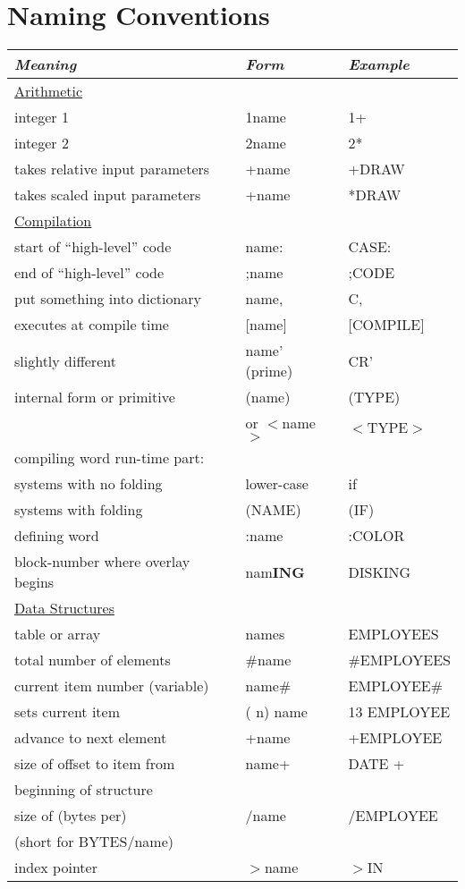 \section{Naming Conventions}
\begin{longtable}{lll}
{}{\setlength{\parsep}{0cm}}
{\em Meaning}&{\em Form}&{\em Example}\\[2ex] \endhead
\underline{Arithmetic}\\
integer 1&1name&1+\\
integer 2&2name&2*\\
takes relative input parameters&+name&+DRAW\\
takes scaled input parameters&+name&*DRAW\\[1ex]
\underline{Compilation}\\
start of ``high-level'' code&name:&CASE:\\
end of ``high-level'' code&;name&;CODE\\
put something into dictionary&name,&C,\\
executes at compile time&[name]&[COMPILE]\\
slightly different&name' (prime)&CR'\\
internal form or primitive&(name)&(TYPE)\\
&or \(<\)name\(>\)&\(<\)TYPE\(>\)\\
compiling word run-time part:\\
 systems with no folding&lower-case&if\\
 systems with folding&(NAME)&(IF)\\
defining word&:name&:COLOR\\
block-number where overlay begins&nam{\bf ING}&DISKING\\[1ex]
\underline{Data Structures}\\
table or array&names&EMPLOYEES\\
total number of elements&\#name&\#EMPLOYEES\\
current item number (variable)&name\#&EMPLOYEE\#\\
sets current item&( n) name&13 EMPLOYEE\\
advance to next element&+name&+EMPLOYEE\\
size of offset to item from&name+&DATE +\\
beginning of structure\\
size of (bytes per)&/name&/EMPLOYEE\\
(short for BYTES/name)\\
index pointer&\(>\)name&\(>\)IN\\

\end{longtable}
